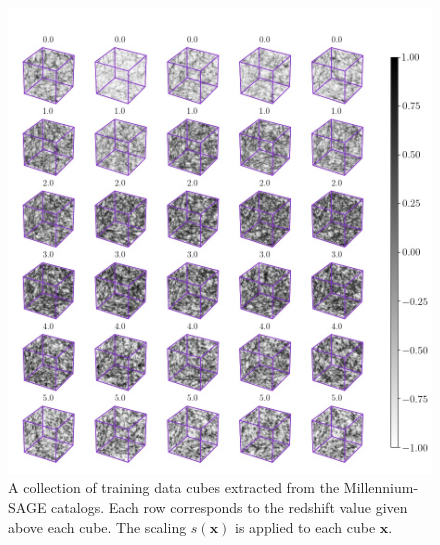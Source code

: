 \documentclass[twocolumn]{article}
\numberwithin{equation}{section}
\begin{document}
\begin{figure}[hbt!]
\includegraphics[width=15cm]{figures/cubes/classes3d.jpg}
\centering
\caption{A collection of training data cubes extracted from the Millennium-SAGE catalogs. Each row corresponds to the 
         redshift value given above each cube. The scaling $s(\mathbf{x})$ is applied to each cube $\mathbf{x}$.}
\label{fig:t_z_imgs}
\end{figure}
\end{document}
